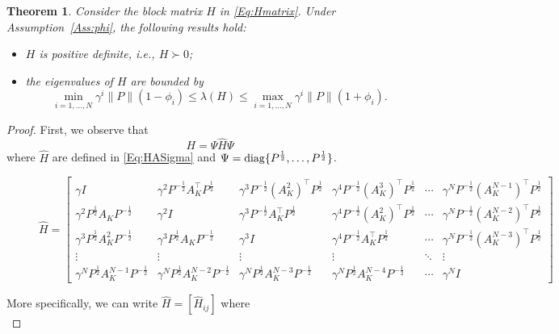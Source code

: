 \documentclass[letterpaper, 10 pt, conference]{ieeeconf}  %
\newtheorem{theorem}{Theorem}[section]
\begin{document}
\begin{theorem}\label{The:posdef}
Consider the block matrix $H$ in \eqref{Eq:Hmatrix}.   Under Assumption~\ref{Ass:phi}, the following results hold:
 \begin{itemize}
     \item [(i)] $H$ is positive definite, i.e., $H\succ 0$;
     \item [(ii)]  the eigenvalues of $H$ are bounded by  
         \begin{equation*}
         \underset{i=1,\dots,N}{\min}\gamma^i \|P\| (1-\phi_i) \leq \lambda(H) \leq \underset{i=1,\dots,N}{\max} \gamma^i \|P\| (1+\phi_i).
         \end{equation*}
 \end{itemize}
\end{theorem}
\begin{proof}
First, we observe that  
$$H=\Psi \hat{H} \Psi$$ where 
$\hat{H} $ are defined in \eqref{Eq:HASigma} and  
$\Psi={\rm diag}\{P^{\frac{1}{2}},\ldots, P^{\frac{1}{2}}\}$. 
\begin{figure}
 \begin{equation}\label{Eq:HASigma}
    \hat{H} =\begin{bmatrix}
\gamma I & \gamma^2 P^{-\frac{1}{2}}A_K^\top P^{\frac{1}{2}} & \gamma^3 P^{-\frac{1}{2}}(A_K^2)^\top P^{\frac{1}{2}} & \gamma^4 P^{-\frac{1}{2}}(A_K^3)^\top P^{\frac{1}{2}} & \cdots & \gamma^N P^{-\frac{1}{2}}(A_K^{N-1})^\top P^{\frac{1}{2}} \\
\gamma^2 P^{\frac{1}{2}} A_K P^{-\frac{1}{2}} & \gamma^2 I & \gamma^3 P^{-\frac{1}{2}}A_K^\top P^{\frac{1}{2}} & \gamma^4 P^{-\frac{1}{2}} (A_K^2)^\top P^{\frac{1}{2}} & \cdots & \gamma^N P^{-\frac{1}{2}} (A_K^{N-2})^\top P^{\frac{1}{2}} \\
\gamma^3 P^{\frac{1}{2}} A_K^2P^{-\frac{1}{2}} & \gamma^3 P^{\frac{1}{2}} A_K P^{-\frac{1}{2}} & \gamma^3 I & \gamma^4 P^{-\frac{1}{2}}  A_K^\top P^{\frac{1}{2}}   & \cdots & \gamma^N P^{-\frac{1}{2}} (A_K^{N-3})^\top P^{\frac{1}{2}}  \\
\vdots & \vdots & \vdots & \vdots & \ddots & \vdots\\
\gamma^N P^{\frac{1}{2}}  A_K^{N-1}P^{-\frac{1}{2}} & \gamma^N P^{\frac{1}{2}}  A_K^{N-2} P^{-\frac{1}{2}} & \gamma^N P^{\frac{1}{2}}  A_K^{N-3} P^{-\frac{1}{2}} & \gamma^N P^{\frac{1}{2}}  A_K^{N-4}P^{-\frac{1}{2}} &\cdots& \gamma^N I
\end{bmatrix} 
    \end{equation}
    \hrulefill
        \end{figure} More specifically, we can write $\hat{H}=[\hat{H}_{ij}]$ where \begin{equation}

\end{equation}
\end{proof}
\end{document}
